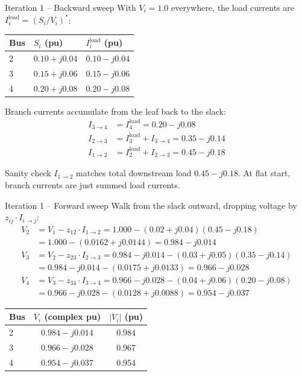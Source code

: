 \documentclass[aspectratio=169,10pt]{beamer}
\begin{document}
\begin{frame}{Iteration 1 -- Backward sweep}
With $V_i = 1.0$ everywhere, the load currents are $I^{\text{load}}_i = (S_i / V_i)^*$:
\vspace{0.3em}
\centering
\small
\begin{tabular}{lll}
\toprule
Bus & $S_i$ (pu) & $I^{\text{load}}_i$ (pu) \\
\midrule
2 & $0.10 + j0.04$ & $0.10 - j0.04$ \\
3 & $0.15 + j0.06$ & $0.15 - j0.06$ \\
4 & $0.20 + j0.08$ & $0.20 - j0.08$ \\
\bottomrule
\end{tabular}
\vspace{0.5em}
Branch currents accumulate from the leaf back to the slack:
\begin{align*}
I_{3\to 4} &= I^{\text{load}}_4 = 0.20 - j0.08 \\
I_{2\to 3} &= I^{\text{load}}_3 + I_{3\to 4} = 0.35 - j0.14 \\
I_{1\to 2} &= I^{\text{load}}_2 + I_{2\to 3} = 0.45 - j0.18
\end{align*}
\begin{block}{Sanity check}
$I_{1\to 2}$ matches total downstream load $0.45 - j0.18$. At flat start, branch currents are just summed load currents.
\end{block}
\end{frame}

\begin{frame}{Iteration 1 -- Forward sweep}
Walk from the slack outward, dropping voltage by $z_{ij} \cdot I_{i \to j}$:
\vspace{0.3em}
\begin{align*}
V_2 &= V_1 - z_{12} \cdot I_{1\to 2}
     = 1.000 - (0.02 + j0.04)(0.45 - j0.18) \\
     &= 1.000 - (0.0162 + j0.0144) = 0.984 - j0.014 \\
V_3 &= V_2 - z_{23} \cdot I_{2\to 3}
     = 0.984 - j0.014 - (0.03 + j0.05)(0.35 - j0.14) \\
     &= 0.984 - j0.014 - (0.0175 + j0.0133) = 0.966 - j0.028 \\
V_4 &= V_3 - z_{34} \cdot I_{3\to 4}
     = 0.966 - j0.028 - (0.04 + j0.06)(0.20 - j0.08) \\
     &= 0.966 - j0.028 - (0.0128 + j0.0088) = 0.954 - j0.037
\end{align*}
\vspace{0.3em}
\centering
\small
\begin{tabular}{lcc}
\toprule
Bus & $V_i$ (complex pu) & $|V_i|$ (pu) \\
\midrule
2 & $0.984 - j0.014$ & 0.984 \\
3 & $0.966 - j0.028$ & 0.967 \\
4 & $0.954 - j0.037$ & 0.954 \\
\bottomrule
\end{tabular}
\end{frame}
\end{document}
